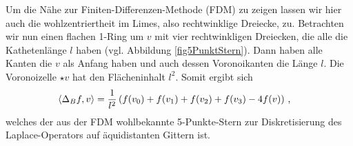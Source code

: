 \begin{bemerkung}
      Um die Nähe zur Finiten-Differenzen-Methode (FDM) zu zeigen lassen wir hier auch die wohlzentriertheit im Limes, also rechtwinklige Dreiecke, zu.
      Betrachten wir nun einen flachen 1-Ring um \( v \) mit vier rechtwinkligen Dreiecken, die alle die Kathetenlänge \( l \) haben (vgl. Abbildung \ref{fig5PunktStern}).
      Dann haben alle Kanten die \( v \) als Anfang haben und auch dessen Voronoikanten die Länge \( l \). 
      Die Voronoizelle \( \star v \) hat den Flächeninhalt \( l^{2} \).
      Somit ergibt sich
      \begin{align}
        \left\langle \Delta_{B} f, v \right\rangle 
         &= \frac{1}{l^{2}}\left( f(v_{0}) + f(v_{1}) + f(v_{2}) + f(v_{3}) - 4f(v) \right) \,\text{,}
      \end{align}
      welches der aus der FDM wohlbekannte 5-Punkte-Stern zur Diskretisierung des Laplace-Operators auf äquidistanten Gittern ist. 
    \end{bemerkung}




